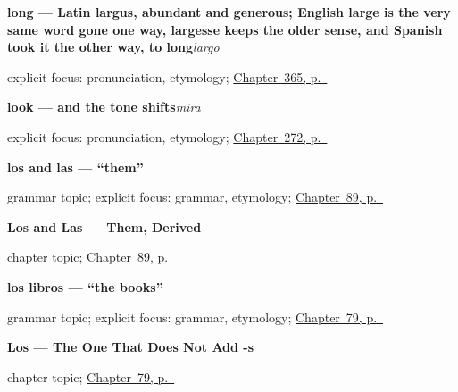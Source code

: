 \noindent\begin{minipage}[t]{\linewidth}
\raggedright
\textbf{long — Latin largus, abundant and generous; English large is the very same word gone one way, largesse keeps the older sense, and Spanish took it the other way, to long}\enspace\emph{largo}\par
\footnotesize explicit focus: pronunciation, etymology; \hyperref[ch:alto-y-largo]{Chapter~365, p.~\pageref*{ch:alto-y-largo}}
\end{minipage}\par\smallskip

\noindent\begin{minipage}[t]{\linewidth}
\raggedright
\textbf{look — and the tone shifts}\enspace\emph{mira}\par
\footnotesize explicit focus: pronunciation, etymology; \hyperref[ch:entrelineas]{Chapter~272, p.~\pageref*{ch:entrelineas}}
\end{minipage}\par\smallskip

\noindent\begin{minipage}[t]{\linewidth}
\raggedright
\textbf{los and las — \textquotedblleft{}them\textquotedblright{}}\par
\footnotesize grammar topic; explicit focus: grammar, etymology; \hyperref[ch:pronoun-plural]{Chapter~89, p.~\pageref*{ch:pronoun-plural}}
\end{minipage}\par\smallskip

\noindent\begin{minipage}[t]{\linewidth}
\raggedright
\textbf{Los and Las --- Them, Derived}\par
\footnotesize chapter topic; \hyperref[ch:pronoun-plural]{Chapter~89, p.~\pageref*{ch:pronoun-plural}}
\end{minipage}\par\smallskip

\noindent\begin{minipage}[t]{\linewidth}
\raggedright
\textbf{los libros — \textquotedblleft{}the books\textquotedblright{}}\par
\footnotesize grammar topic; explicit focus: grammar, etymology; \hyperref[ch:articles-los]{Chapter~79, p.~\pageref*{ch:articles-los}}
\end{minipage}\par\smallskip

\noindent\begin{minipage}[t]{\linewidth}
\raggedright
\textbf{Los --- The One That Does Not Add -s}\par
\footnotesize chapter topic; \hyperref[ch:articles-los]{Chapter~79, p.~\pageref*{ch:articles-los}}
\end{minipage}\par\smallskip

